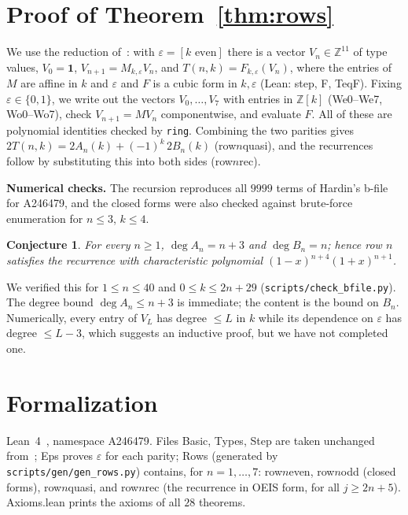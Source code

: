 \documentclass[11pt]{article}
\newtheorem{conjecture}[theorem]{Conjecture}
\theoremstyle{remark}\newtheorem{remark}[theorem]{Remark}
\newcommand{\lean}[1]{{\ttfamily\def\_{\textunderscore\allowbreak}#1}}
\begin{document}
\section{Proof of Theorem~\ref{thm:rows}}
We use the reduction of~\cite{a246479}: with $\varepsilon=[k\text{ even}]$ there is a vector $V_n\in\mathbb Z^{11}$ of type values, $V_0=\mathbf 1$, $V_{n+1}=M_{k,\varepsilon}V_n$, and $T(n,k)=F_{k,\varepsilon}(V_n)$, where the entries of $M$ are affine in $k$ and $\varepsilon$ and $F$ is a cubic form in $k,\varepsilon$ (Lean: \lean{step}, \lean{F}, \lean{T\_eq\_F}). Fixing $\varepsilon\in\{0,1\}$, we write out the vectors $V_0,\dots,V_7$ with entries in $\mathbb Z[k]$ (\lean{We0}--\lean{We7}, \lean{Wo0}--\lean{Wo7}), check $V_{n+1}=MV_n$ componentwise, and evaluate $F$. All of these are polynomial identities checked by \texttt{ring}. Combining the two parities gives $2T(n,k)=2A_n(k)+(-1)^k\,2B_n(k)$ (\lean{row}$n$\lean{\_quasi}), and the recurrences follow by substituting this into both sides (\lean{row}$n$\lean{\_rec}).

\textbf{Numerical checks.} The recursion reproduces all $9999$ terms of Hardin's b-file for A246479, and the closed forms were also checked against brute-force enumeration for $n\le3$, $k\le4$.

\begin{conjecture}
For every $n\ge1$, $\deg A_n=n+3$ and $\deg B_n=n$; hence row $n$ satisfies the recurrence with characteristic polynomial $(1-x)^{n+4}(1+x)^{n+1}$.
\end{conjecture}
We verified this for $1\le n\le 40$ and $0\le k\le 2n+29$ (\texttt{scripts/check\_bfile.py}). The degree bound $\deg A_n\le n+3$ is immediate; the content is the bound on $B_n$. Numerically, every entry of $V_L$ has degree $\le L$ in $k$ while its dependence on $\varepsilon$ has degree $\le L-3$, which suggests an inductive proof, but we have not completed one.

\section{Formalization}
Lean~4~\cite{lean4}, namespace \lean{A246479}. Files \lean{Basic}, \lean{Types}, \lean{Step} are taken unchanged from~\cite{a246479}; \lean{Eps} proves $\varepsilon$ for each parity; \lean{Rows} (generated by \texttt{scripts/gen/gen\_rows.py}) contains, for $n=1,\dots,7$: \lean{row}$n$\lean{\_even}, \lean{row}$n$\lean{\_odd} (closed forms), \lean{row}$n$\lean{\_quasi}, and \lean{row}$n$\lean{\_rec} (the recurrence in OEIS form, for all $j\ge 2n+5$). \lean{Axioms.lean} prints the axioms of all $28$ theorems.
\end{document}
